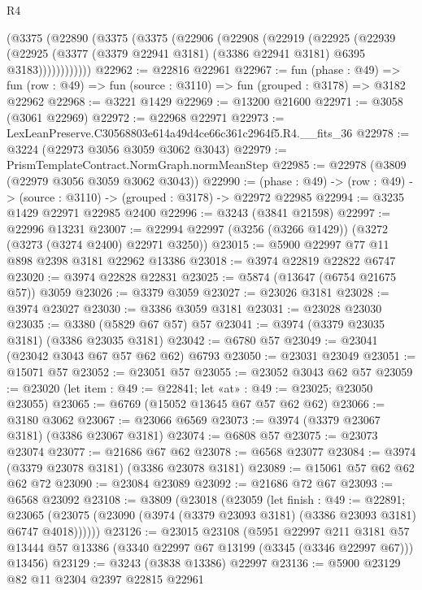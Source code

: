 \begin{lexlean}{R4}
\begin{coremodule}
      (@3375
        (@22890
          (@3375
            (@3375
              (@22906
                (@22908
                  (@22919
                    (@22925
                      (@22939
                        (@22925
                          (@3377 (@3379 @22941 @3181) (@3386 @22941 @3181) @6395 @3183))))))))))))
@22962 := @22816 @22961
@22967 := fun (phase : @49) =>
  fun (row : @49) => fun (source : @3110) => fun (grouped : @3178) => @3182 @22962
@22968 := @3221 @1429
@22969 := @13200 @21600
@22971 := @3058 (@3061 @22969)
@22972 := @22968 @22971
@22973 := LexLeanPreserve.C30568803e614a49d4ce66c361c2964f5.R4.__fits_36
@22978 := @3224 (@22973 @3056 @3059 @3062 @3043)
@22979 := PrismTemplateContract.NormGraph.normMeanStep
@22985 := @22978 (@3809 (@22979 @3056 @3059 @3062 @3043))
@22990 := (phase : @49) -> (row : @49) -> (source : @3110) -> (grouped : @3178) -> @22972 @22985
@22994 := @3235 @1429 @22971 @22985 @2400
@22996 := @3243 (@3841 @21598)
@22997 := @22996 @13231
@23007 := @22994 @22997 (@3256 (@3266 @1429)) (@3272 (@3273 (@3274 @2400) @22971 @3250))
@23015 := @5900 @22997 @77 @11 @898 @2398 @3181 @22962 @13386
@23018 := @3974 @22819 @22822 @6747
@23020 := @3974 @22828 @22831
@23025 := @5874 (@13647 (@6754 @21675 @57)) @3059
@23026 := @3379 @3059
@23027 := @23026 @3181
@23028 := @3974 @23027
@23030 := @3386 @3059 @3181
@23031 := @23028 @23030
@23035 := @3380 (@5829 @67 @57) @57
@23041 := @3974 (@3379 @23035 @3181) (@3386 @23035 @3181)
@23042 := @6780 @57
@23049 := @23041 (@23042 @3043 @67 @57 @62 @62) @6793
@23050 := @23031 @23049
@23051 := @15071 @57
@23052 := @23051 @57
@23055 := @23052 @3043 @62 @57
@23059 := @23020 (let item : @49 := @22841; let «at» : @49 := @23025; @23050 @23055)
@23065 := @6769 (@15052 @13645 @67 @57 @62 @62)
@23066 := @3180 @3062
@23067 := @23066 @6569
@23073 := @3974 (@3379 @23067 @3181) (@3386 @23067 @3181)
@23074 := @6808 @57
@23075 := @23073 @23074
@23077 := @21686 @67 @62
@23078 := @6568 @23077
@23084 := @3974 (@3379 @23078 @3181) (@3386 @23078 @3181)
@23089 := @15061 @57 @62 @62 @62 @72
@23090 := @23084 @23089
@23092 := @21686 @72 @67
@23093 := @6568 @23092
@23108 := @3809
    (@23018
      (@23059
        (let finish : @49 := @22891;
        @23065 (@23075 (@23090 (@3974 (@3379 @23093 @3181) (@3386 @23093 @3181) @6747 @4018))))))
@23126 := @23015
    @23108
    (@5951
      @22997
      @211
      @3181
      @57
      @13444
      @57
      @13386
      (@3340 @22997 @67 @13199 (@3345 (@3346 @22997 @67)))
      @13456)
@23129 := @3243 (@3838 @13386) @22997
@23136 := @5900 @23129 @82 @11 @2304 @2397 @22815 @22961

\end{coremodule}
\end{lexlean}
